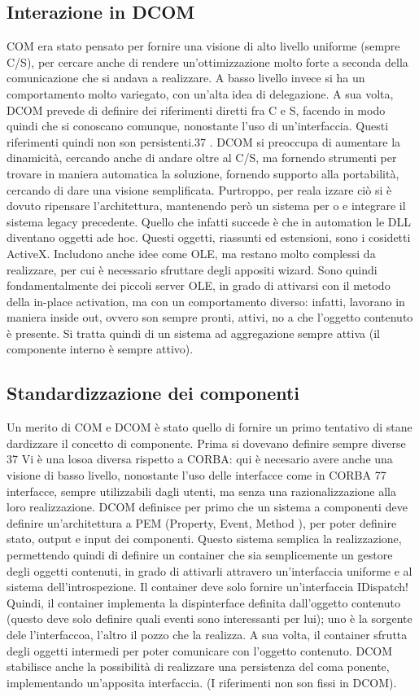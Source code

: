 \subsection{Interazione in DCOM}
COM era stato pensato per fornire una visione di alto livello uniforme (sempre
C/S), per cercare anche di rendere un'ottimizzazione molto forte a seconda
della comunicazione che si andava a realizzare. A basso livello invece si ha un
comportamento molto variegato, con un'alta idea di delegazione.
A sua volta, DCOM prevede di definire dei riferimenti diretti fra C e S,
facendo in modo quindi che si conoscano comunque, nonostante l'uso di un'interfaccia. Questi riferimenti quindi non son
persistenti.37 . DCOM si preoccupa
di aumentare la dinamicità, cercando anche di andare oltre al C/S, ma fornendo
strumenti per trovare in maniera automatica la soluzione, fornendo supporto
alla portabilità, cercando di dare una visione semplificata. Purtroppo, per reala
izzare ciò si è dovuto ripensare l'architettura, mantenendo però un sistema per
o e
integrare il sistema legacy precedente.
Quello che infatti succede è che in automation le DLL diventano oggetti ade
hoc. Questi oggetti, riassunti ed estensioni, sono i cosidetti ActiveX. Includono
anche idee come OLE, ma restano molto complessi da realizzare, per cui è
necessario sfruttare degli appositi wizard. Sono quindi fondamentalmente dei
piccoli server OLE, in grado di attivarsi con il metodo della in-place activation,
ma con un comportamento diverso: infatti, lavorano in maniera inside out,
ovvero son sempre pronti, attivi, no a che l'oggetto contenuto è presente. Si
tratta quindi di un sistema ad aggregazione sempre attiva (il componente interno
è sempre attivo).
\subsection{Standardizzazione dei componenti}
Un merito di COM e DCOM è stato quello di fornire un primo tentativo di stane
dardizzare il concetto di componente. Prima si dovevano definire sempre diverse
37 Vi è una losoa diversa rispetto a CORBA: qui è necesario avere anche una visione di
basso livello, nonostante l'uso delle interfacce come in CORBA
77
interfacce, sempre utilizzabili dagli utenti, ma senza una razionalizzazione alla
loro realizzazione.
DCOM definisce per primo che un sistema a componenti deve definire un'architettura a PEM (Property, Event, Method ), per
poter definire stato, output
e input dei componenti. Questo sistema semplica la realizzazione, permettendo quindi di definire un container che sia
semplicemente un gestore degli oggetti
contenuti, in grado di attivarli attravero un'interfaccia uniforme e al sistema dell'introspezione. Il container deve
solo fornire un'interfaccia IDispatch! Quindi,
il container implementa la dispinterface definita dall'oggetto contenuto (questo
deve solo definire quali eventi sono interessanti per lui); uno è la sorgente dele
l'interfaccoa, l'altro il pozzo che la realizza. A sua volta, il container sfrutta
degli oggetti intermedi per poter comunicare con l'oggetto contenuto.
DCOM stabilisce anche la possibilità di realizzare una persistenza del coma
ponente, implementando un'apposita interfaccia. (I riferimenti non son fissi in
DCOM).
